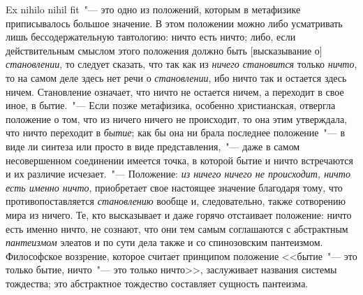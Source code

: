 Ex nihilo nihil fit~"--- это одно из положений, которым
в метафизике приписывалось большое значение. В этом
положении можно либо усматривать лишь бессодержательную
тавтологию: ничто есть ничто; либо, если действительным
смыслом этого положения должно быть
[высказывание о] \emph{становлении}, то следует сказать, что
так как из \emph{ничего становится} только \emph{ничто}, то на самом
деле здесь нет речи о \emph{становлении}, ибо ничто так и
остается здесь ничем. Становление означает, что ничто
не остается ничем, а переходит в свое иное, в бытие.~"---
Если позже метафизика, особенно христианская, отвергла
положение о том, что из ничего ничего не происходит,
то она этим утверждала, что ничто переходит в \emph{бытие};
как бы она ни брала последнее положение~"--- в виде ли
синтеза или просто в виде представления,~"--- даже в самом
несовершенном соединении имеется точка, в которой
бытие и ничто встречаются и их различие исчезает.~"---
Положение: \emph{из ничего ничего не происходит, ничто есть
именно ничто}, приобретает свое настоящее значение благодаря
тому, что противопоставляется \emph{становлению} вообще
и, следовательно, также сотворению мира из ничего.
Те, кто высказывает и даже горячо отстаивает положение:
ничто есть именно ничто, не сознают, что они тем
самым соглашаются с абстрактным \emph{пантеизмом} элеатов
и по сути дела также и со спинозовским пантеизмом.
Философское воззрение, которое считает принципом положение
<<бытие~"--- это только бытие, ничто~"--- это только
ничто>>, заслуживает названия системы тождества; это
абстрактное тождество составляет сущность пантеизма.

